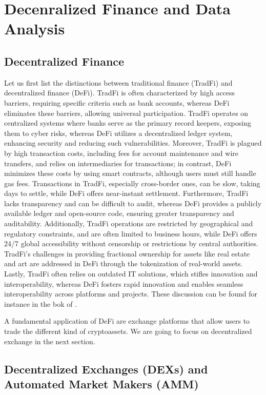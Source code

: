 \chapter{Decenralized Finance and Data Analysis}\label{chap:defi}

\section{Decentralized Finance}

Let us first list the distinctions between traditional finance (TradFi) and decentralized finance (DeFi). TradFi is often characterized by high access barriers, requiring specific criteria such as bank accounts, whereas DeFi eliminates these barriers, allowing universal participation. TradFi operates on centralized systems where banks serve as the primary record keepers, exposing them to cyber risks, whereas DeFi utilizes a decentralized ledger system, enhancing security and reducing such vulnerabilities. Moreover, TradFi is plagued by high transaction costs, including fees for account maintenance and wire transfers, and relies on intermediaries for transactions; in contrast, DeFi minimizes these costs by using smart contracts, although users must still handle gas fees. Transactions in TradFi, especially cross-border ones, can be slow, taking days to settle, while DeFi offers near-instant settlement. Furthermore, TradFi lacks transparency and can be difficult to audit, whereas DeFi provides a publicly available ledger and open-source code, ensuring greater transparency and auditability. Additionally, TradFi operations are restricted by geographical and regulatory constraints, and are often limited to business hours, while DeFi offers 24/7 global accessibility without censorship or restrictions by central authorities. TradFi's challenges in providing fractional ownership for assets like real estate and art are addressed in DeFi through the tokenization of real-world assets. Lastly, TradFi often relies on outdated IT solutions, which stifles innovation and interoperability, whereas DeFi fosters rapid innovation and enables seamless interoperability across platforms and projects. These discussion can be found for instance in the bok of \citet{Lipton2021}.

A fundamental application of DeFi are exchange platforms that allow users to trade the different kind of cryptoassets. We are going to focus on decentralized exchange in the next section.

\section{Decentralized Exchanges (DEXs) and Automated Market Makers (AMM)}

